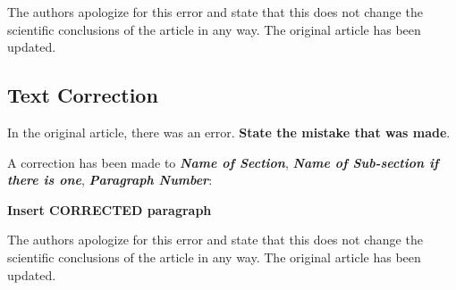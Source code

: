 \documentclass[utf8]{frontiers_correction}
\begin{document}
The authors apologize for this error and state that this does not change the scientific conclusions of the article in any way. The original article has been updated.


\subsection*{Text Correction}
In the original article, there was an error. \textbf{State the mistake that was made}.\par
A correction has been made to \textbf{\textit{Name of Section}}, \textbf{\textit{Name of Sub-section if there is one}}, \textbf{\textit{Paragraph Number}}:\par

\textbf{Insert CORRECTED paragraph}\par %

The authors apologize for this error and state that this does not change the scientific conclusions of the article in any way. The original article has been updated.







%
%
\end{document}
